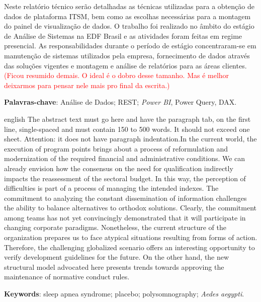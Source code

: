 
\begin{resumo}
Neste relatório técnico serão detalhadas as técnicas utilizadas para a obtenção de dados de plataforma ITSM, bem como as escolhas necessárias para a montagem do painel de visualização de dados. O trabalho foi realizado no âmbito do estágio de Análise de Sistemas na EDF Brasil e as atividades foram feitas em regime presencial. As responsabilidades durante o período de estágio concentraram-se em manutenção de sistemas utilizados pela empresa, fornecimento de dados através das soluções vigentes e montagem e análise de relatórios para as áreas clientes.
\textcolor{red}{(Ficou resumido demais. O ideal é o dobro desse tamanho. Mas é melhor deixarmos para pensar nele mais pro final da escrita.)}

 \vspace{\onelineskip}
 \noindent
 \textbf{Palavras-chave}: Análise de Dados; REST; \textit{Power BI}, Power Query, DAX.
\end{resumo}

\begin{resumo}[ABSTRACT]
\begin{otherlanguage*}{english}
The abstract text must go here and have the paragraph tab, on the first line,
single-spaced and must contain 150 to 500 words. It should not exceed one sheet.
Attention: it does not have paragraph indentation.In the current world, the execution of program points brings about a process of reformulation and modernization of the required financial and administrative conditions. We can already envision how the consensus on the need for qualification indirectly impacts the reassessment of the sectoral budget. In this way, the perception of difficulties is part of a process of managing the intended indexes.
The commitment to analyzing the constant dissemination of information challenges the ability to balance alternatives to orthodox solutions. Clearly, the commitment among teams has not yet convincingly demonstrated that it will participate in changing corporate paradigms. Nonetheless, the current structure of the organization prepares us to face atypical situations resulting from forms of action. Therefore, the challenging globalized scenario offers an interesting opportunity to verify development guidelines for the future. On the other hand, the new structural model advocated here presents trends towards approving the maintenance of normative conduct rules.

\vspace{\onelineskip}
\noindent 
\textbf{Keywords}: sleep apnea syndrome; placebo; polysomnography; \textit{Aedes aegypti}.
\end{otherlanguage*}
\end{resumo}
